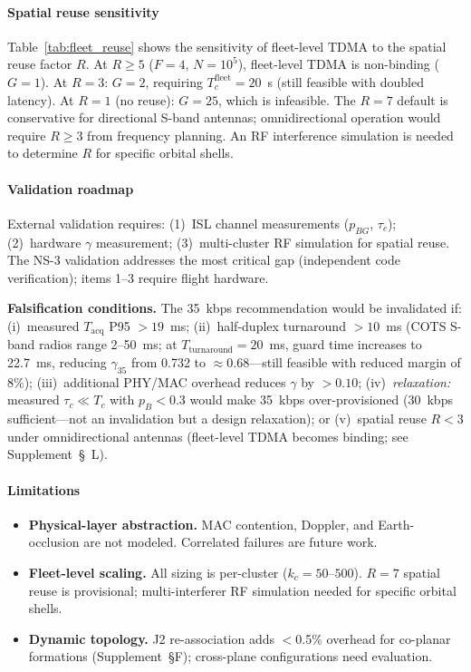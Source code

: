 \documentclass[journal]{IEEEtran}
\begin{document}
\paragraph{Spatial reuse sensitivity}
Table~\ref{tab:fleet_reuse} shows the sensitivity of fleet-level TDMA to the spatial reuse factor $R$. At $R \geq 5$ ($F{=}4$, $N{=}10^5$), fleet-level TDMA is non-binding ($G{=}1$). At $R{=}3$: $G{=}2$, requiring $T_c^{\text{fleet}}{=}20$~s (still feasible with doubled latency). At $R{=}1$ (no reuse): $G{=}25$, which is infeasible. The $R{=}7$ default is conservative for directional S-band antennas; omnidirectional operation would require $R \geq 3$ from frequency planning. An RF interference simulation is needed to determine $R$ for specific orbital shells.

\paragraph{Validation roadmap}
External validation requires: (1)~ISL channel measurements ($p_{BG}$, $\tau_c$); (2)~hardware $\gamma$ measurement; (3)~multi-cluster RF simulation for spatial reuse. The NS-3 validation addresses the most critical gap (independent code verification); items 1--3 require flight hardware.

\textbf{Falsification conditions.} The 35~kbps recommendation would be invalidated if: (i)~measured $T_{\text{acq}}$ P95 $> 19$~ms; (ii)~half-duplex turnaround $> 10$~ms (COTS S-band radios range 2--50~ms; at $T_{\text{turnaround}} = 20$~ms, guard time increases to 22.7~ms, reducing $\gamma_{35}$ from 0.732 to ${\approx}0.68$---still feasible with reduced margin of 8\%); (iii)~additional PHY/MAC overhead reduces $\gamma$ by $> 0.10$; (iv)~\emph{relaxation:} measured $\tau_c \ll T_c$ with $p_B < 0.3$ would make 35~kbps over-provisioned (30~kbps sufficient---not an invalidation but a design relaxation); or (v)~spatial reuse $R < 3$ under omnidirectional antennas (fleet-level TDMA becomes binding; see Supplement~\S~L).

\paragraph{Limitations}
\begin{itemize}
    \item \textbf{Physical-layer abstraction.} MAC contention, Doppler, and Earth-occlusion are not modeled. Correlated failures are future work.
    \item \textbf{Fleet-level scaling.} All sizing is per-cluster ($k_c = 50$--$500$). $R = 7$ spatial reuse is provisional; multi-interferer RF simulation needed for specific orbital shells.
    \item \textbf{Dynamic topology.} J2 re-association adds $<$0.5\% overhead for co-planar formations (Supplement~\S F); cross-plane configurations need evaluation.
\end{itemize}
\end{document}
